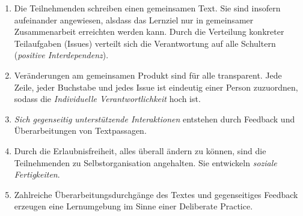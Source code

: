 \documentclass
	[
		11pt,
		a4paper,
		oneside,
		ngerman
	]
	{article}
\begin{document}
\begin{enumerate}

	\item Die Teilnehmenden schreiben einen gemeinsamen Text.
	Sie sind insofern aufeinander angewiesen, alsdass das Lernziel nur in gemeinsamer Zusammenarbeit erreichten werden kann.
	Durch die Verteilung konkreter Teilaufgaben (Issues) verteilt sich die Verantwortung auf alle Schultern (\emph{positive Interdependenz}).
	\item Veränderungen am gemeinsamen Produkt sind für alle transparent.
	Jede Zeile, jeder Buchstabe und jedes Issue ist eindeutig einer Person zuzuordnen, sodass die \emph{Individuelle Verantwortlichkeit} hoch ist.
	\item \emph{Sich gegenseitig unterstützende Interaktionen} entstehen durch Feedback und Überarbeitungen von Textpassagen.
	\item Durch die Erlaubnisfreiheit, alles überall ändern zu können, sind die Teilnehmenden zu Selbstorganisation angehalten.
	Sie entwickeln \emph{soziale Fertigkeiten}.
	\cite[vgl.][]{johnson-1999}
	\item Zahlreiche Überarbeitungsdurchgänge des Textes und gegenseitiges Feedback erzeugen eine Lernumgebung im Sinne einer Deliberate Practice.

\end{enumerate}






\end{document}
